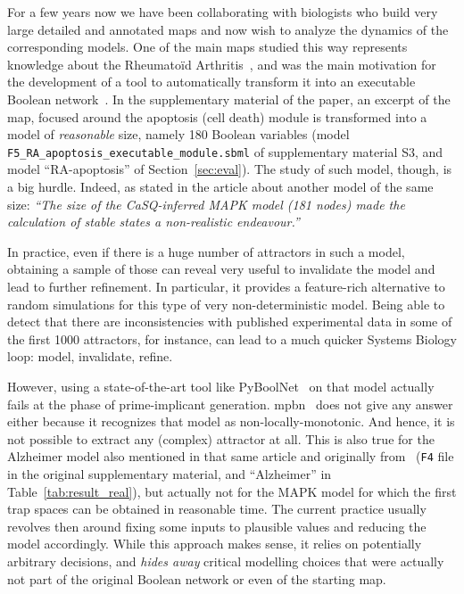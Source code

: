 \documentclass[preprint,12pt]{elsarticle}
\begin{document}
For a few years now we have been collaborating with biologists who build very large detailed and annotated maps and now wish to analyze the dynamics of the corresponding models.
One of the main maps studied this way represents knowledge about the Rheumatoïd Arthritis~\cite{singh2018computational}, and was the main motivation for the development of a tool to automatically transform it into an executable Boolean network~\cite{aghamiri2020automated}.
In the supplementary material of the paper, an excerpt of the map, focused around the apoptosis (cell death) module is transformed into a model of \emph{reasonable} size, namely 180 Boolean variables (model \verb|F5_RA_apoptosis_executable_module.sbml| of supplementary material S3, and model ``RA-apoptosis'' of Section~\ref{sec:eval}).
The study of such model, though, is a big hurdle.
Indeed, as stated in the article about another model of the same size:
\emph{``The size of the CaSQ-inferred MAPK model (181 nodes) made the calculation of stable states a non-realistic endeavour.''}

In practice, even if there is a huge number of attractors in such a model, obtaining a sample of those can reveal very useful to invalidate the model and lead to further refinement.
In particular, it provides a feature-rich alternative to random simulations for this type of very non-deterministic model.
Being able to detect that there are inconsistencies with published experimental data in some of the first 1000 attractors, for instance, can lead to a much quicker Systems Biology loop: model, invalidate, refine.

However, using a state-of-the-art tool like PyBoolNet~\cite{klarner2015computing} on that model actually fails at the phase of prime-implicant generation.
mpbn~\cite{Paulev2020} does not give any answer either because it recognizes that model as non-locally-monotonic.
And hence, it is not possible to extract any (complex) attractor at all.
This is also true for the Alzheimer model also mentioned in that same article and originally from~\cite{ogishima2016alzpathway} (\verb|F4| file in the original supplementary material, and ``Alzheimer'' in Table~\ref{tab:result_real}), but actually not for the MAPK model for which the first trap spaces can be obtained in reasonable time.
The current practice usually revolves then around fixing some inputs to plausible values and reducing the model accordingly.
While this approach makes sense, it relies on potentially arbitrary decisions, and \emph{hides away} critical modelling choices that were actually not part of the original Boolean network or even of the starting map.
\end{document}
